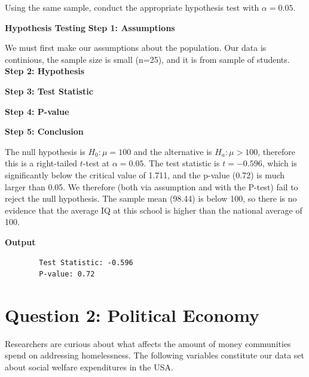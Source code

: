 \documentclass[12pt,letterpaper]{article}
\begin{document}
\begin{enumerate}
	\noindent Using the same sample, conduct the appropriate hypothesis test with $\alpha=0.05$.

	\vspace{2cm}

	\textbf{Hypothesis Testing}
	\textbf{Step 1: Assumptions}

		We must first make our assumptions about the population. Our data is continious, the sample size is small (n=25), and it is from sample of students.
	\vspace{.3cm}
	\textbf{Step 2: Hypothesis}
	
	\vspace{.3cm}
	\textbf{Step 3: Test Statistic}
	
	\vspace{.3cm}
	\textbf{Step 4: P-value}
	
	\vspace{.3cm}
	\textbf{Step 5: Conclusion}

	The null hypothesis is $H_0: \mu = 100$ and the alternative is $H_a: \mu > 100$, therefore this is a right-tailed $t$-test at $\alpha = 0.05$. The test statistic is $t = -0.596$, which is significantly below the critical value of 1.711, and the p-value (0.72) is much larger than 0.05. We therefore (both via assumption and with the P-test) fail to reject the null hypothesis. The sample mean (98.44) is below 100, so there is no evidence that the average IQ at this school is higher than the national average of 100.





	\textbf{Output}
	\begin{verbatim}
		Test Statistic: -0.596 
		P-value: 0.72 
	\end{verbatim}


\end{enumerate}

\newpage

	\section*{Question 2: Political Economy}

\noindent Researchers are curious about what affects the amount of money communities spend on addressing homelessness. The following variables constitute our data set about social welfare expenditures in the USA. \\
\vspace{.5cm}
\end{document}
